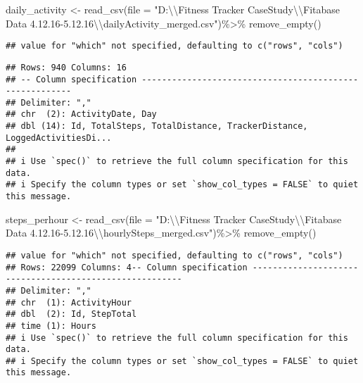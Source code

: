 \documentclass[
]{article}
\newenvironment{Shaded}{\begin{snugshade}}{\end{snugshade}}
\newcommand{\AttributeTok}[1]{\textcolor[rgb]{0.77,0.63,0.00}{#1}}
\newcommand{\FunctionTok}[1]{\textcolor[rgb]{0.00,0.00,0.00}{#1}}
\newcommand{\NormalTok}[1]{#1}
\newcommand{\OtherTok}[1]{\textcolor[rgb]{0.56,0.35,0.01}{#1}}
\newcommand{\SpecialCharTok}[1]{\textcolor[rgb]{0.00,0.00,0.00}{#1}}
\newcommand{\StringTok}[1]{\textcolor[rgb]{0.31,0.60,0.02}{#1}}
\begin{document}
\begin{Shaded}
\begin{Highlighting}[]
\NormalTok{ daily\_activity }\OtherTok{\textless{}{-}} \FunctionTok{read\_csv}\NormalTok{(}\AttributeTok{file =} \StringTok{"D:}\SpecialCharTok{\textbackslash{}\textbackslash{}}\StringTok{Fitness Tracker CaseStudy}\SpecialCharTok{\textbackslash{}\textbackslash{}}\StringTok{Fitabase Data 4.12.16{-}5.12.16}\SpecialCharTok{\textbackslash{}\textbackslash{}}\StringTok{dailyActivity\_merged.csv"}\NormalTok{)}\SpecialCharTok{\%\textgreater{}\%}
 \FunctionTok{remove\_empty}\NormalTok{()}
\end{Highlighting}
\end{Shaded}

\begin{verbatim}
## value for "which" not specified, defaulting to c("rows", "cols")
\end{verbatim}

\begin{verbatim}
## Rows: 940 Columns: 16
## -- Column specification --------------------------------------------------------
## Delimiter: ","
## chr  (2): ActivityDate, Day
## dbl (14): Id, TotalSteps, TotalDistance, TrackerDistance, LoggedActivitiesDi...
## 
## i Use `spec()` to retrieve the full column specification for this data.
## i Specify the column types or set `show_col_types = FALSE` to quiet this message.
\end{verbatim}

\begin{Shaded}
\begin{Highlighting}[]
\NormalTok{ steps\_perhour }\OtherTok{\textless{}{-}} \FunctionTok{read\_csv}\NormalTok{(}\AttributeTok{file =} \StringTok{"D:}\SpecialCharTok{\textbackslash{}\textbackslash{}}\StringTok{Fitness Tracker CaseStudy}\SpecialCharTok{\textbackslash{}\textbackslash{}}\StringTok{Fitabase Data 4.12.16{-}5.12.16}\SpecialCharTok{\textbackslash{}\textbackslash{}}\StringTok{hourlySteps\_merged.csv"}\NormalTok{)}\SpecialCharTok{\%\textgreater{}\%}
 \FunctionTok{remove\_empty}\NormalTok{()}
\end{Highlighting}
\end{Shaded}

\begin{verbatim}
## value for "which" not specified, defaulting to c("rows", "cols")
## Rows: 22099 Columns: 4-- Column specification --------------------------------------------------------
## Delimiter: ","
## chr  (1): ActivityHour
## dbl  (2): Id, StepTotal
## time (1): Hours
## i Use `spec()` to retrieve the full column specification for this data.
## i Specify the column types or set `show_col_types = FALSE` to quiet this message.
\end{verbatim}
\end{document}
